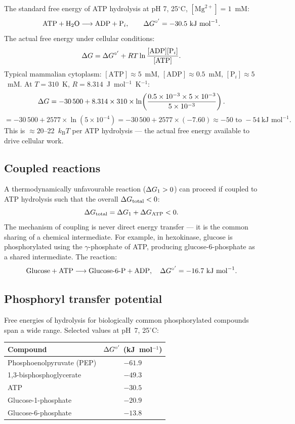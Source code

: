 \documentclass[12pt, a4paper, oneside]{report}
\begin{document}
The standard free energy of ATP hydrolysis at pH 7, 25$^\circ$C,
$[\mathrm{Mg}^{2+}] = 1$~mM:
\[
  \mathrm{ATP} + \mathrm{H}_2\mathrm{O}
  \longrightarrow \mathrm{ADP} + \mathrm{P}_i,
  \qquad \Delta G^{\circ'} = -30.5~\text{kJ~mol}^{-1}.
\]
The actual free energy under cellular conditions:
\begin{equation}
  \Delta G = \Delta G^{\circ'} + RT\ln\frac{[\mathrm{ADP}][\mathrm{P}_i]}
        {[\mathrm{ATP}]}.
  \label{eq:dgatp}
\end{equation}
Typical mammalian cytoplasm: $[\mathrm{ATP}] \approx 5$~mM,
$[\mathrm{ADP}] \approx 0.5$~mM, $[\mathrm{P}_i] \approx 5$~mM.
At $T = 310$~K, $R = 8.314$~J~mol$^{-1}$~K$^{-1}$:
\[
  \Delta G = -30\,500 + 8.314 \times 310 \times
        \ln\!\left(\frac{0.5\times10^{-3} \times 5\times10^{-3}}
                        {5\times10^{-3}}\right).
\]
\[
  = -30\,500 + 2577 \times \ln(5\times10^{-4})
  = -30\,500 + 2577 \times (-7.60)
  \approx -50\text{ to }-54~\text{kJ~mol}^{-1}.
\]
This is $\approx 20$--22~$k_\mathrm{B}T$ per ATP hydrolysis — the actual
free energy available to drive cellular work.

\subsection{Coupled reactions}

A thermodynamically unfavourable reaction ($\Delta G_1 > 0$) can proceed if
coupled to ATP hydrolysis such that the overall $\Delta G_\text{total} < 0$:
\[
  \Delta G_\text{total} = \Delta G_1 + \Delta G_\text{ATP} < 0.
\]
The mechanism of coupling is never direct energy transfer — it is the
common sharing of a chemical intermediate. For example, in hexokinase,
glucose is phosphorylated using the $\gamma$-phosphate of ATP, producing
glucose-6-phosphate as a shared intermediate. The reaction:
\[
  \text{Glucose} + \text{ATP} \longrightarrow
  \text{Glucose-6-P} + \text{ADP},
  \quad \Delta G^{\circ'} = -16.7~\text{kJ~mol}^{-1}.
\]

\subsection{Phosphoryl transfer potential}

Free energies of hydrolysis for biologically common phosphorylated
compounds span a wide range. Selected values at pH~7, 25$^\circ$C:

\begin{center}
\begin{tabular}{lc}
\toprule
Compound & $\Delta G^{\circ'}$ (kJ~mol$^{-1}$) \\
\midrule
Phosphoenolpyruvate (PEP) & $-61.9$ \\
1,3-bisphosphoglycerate  & $-49.3$ \\
ATP                      & $-30.5$ \\
Glucose-1-phosphate      & $-20.9$ \\
Glucose-6-phosphate      & $-13.8$ \\
\bottomrule
\end{tabular}
\end{center}
\end{document}
